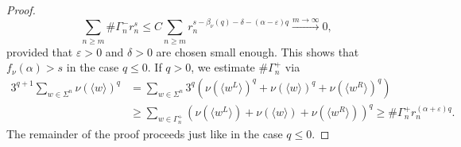 \documentclass[11pt,reqno]{amsart}
\theoremstyle{plain}
\theoremstyle{definition}
\begin{document}
\begin{proof}
\[
\sum_{n\geqslant m} \# \Gamma_n^- r_n^s 
\leqslant C \sum_{n \geqslant m} r_n^{s - \beta_\nu(q) -\delta - (\alpha - \varepsilon) q} \xrightarrow{m \to \infty} 0,
\]
provided that $\varepsilon > 0$ and $\delta>0$ are chosen small enough. This shows that $f_\nu(\alpha) > s$ in the case $q \leqslant 0$. 
If $q>0$, we estimate $\# \Gamma_n^+$ via
\begin{align*}
3^{q+1} \sum_{w \in \Sigma^n}  \nu(\langle w \rangle)^q &=  \sum_{w \in \Sigma^n} 3^q \left(  \nu(\langle w^L \rangle)^q +  \nu(\langle w \rangle)^q +  \nu(\langle w^R \rangle)^q \right)
\\ &\geqslant \sum_{w \in \Gamma_n^+} \left(  \nu(\langle w^L \rangle) + \nu(\langle w \rangle) +  \nu(\langle w^R \rangle) \right)^q 
\geqslant \# \Gamma_n^+ r_n^{(\alpha + \varepsilon)q}.
\end{align*}
The remainder of the proof proceeds just like in the case $q\leqslant 0$.
\end{proof}
\end{document}
